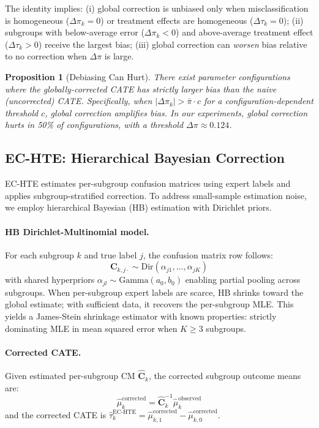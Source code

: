 \documentclass[11pt,twocolumn]{article}
\newtheorem{proposition}{Proposition}
\begin{document}
\noindent The identity implies: (i) global correction is unbiased only when misclassification is homogeneous ($\Delta\pi_k = 0$) or treatment effects are homogeneous ($\Delta\tau_k = 0$); (ii) subgroups with below-average error ($\Delta\pi_k < 0$) and above-average treatment effect ($\Delta\tau_k > 0$) receive the largest bias; (iii) global correction can \emph{worsen} bias relative to no correction when $\Delta\pi$ is large.

\begin{proposition}[Debiasing Can Hurt]
There exist parameter configurations where the globally-corrected CATE has strictly larger bias than the naive (uncorrected) CATE. Specifically, when $|\Delta\pi_k| > \bar{\pi} \cdot c$ for a configuration-dependent threshold $c$, global correction amplifies bias. In our experiments, global correction hurts in 50\% of configurations, with a threshold $\Delta\pi \approx 0.124$.
\end{proposition}

\subsection{EC-HTE: Hierarchical Bayesian Correction}

EC-HTE estimates per-subgroup confusion matrices using expert labels and applies subgroup-stratified correction. To address small-sample estimation noise, we employ hierarchical Bayesian (HB) estimation with Dirichlet priors.

\paragraph{HB Dirichlet-Multinomial model.} For each subgroup $k$ and true label $j$, the confusion matrix row follows:
\begin{equation}
\mathbf{C}_{k,j\cdot} \sim \text{Dir}(\alpha_{j1}, \ldots, \alpha_{jK})
\end{equation}
with shared hyperpriors $\alpha_{jl} \sim \text{Gamma}(a_0, b_0)$ enabling partial pooling across subgroups. When per-subgroup expert labels are scarce, HB shrinks toward the global estimate; with sufficient data, it recovers the per-subgroup MLE. This yields a James-Stein shrinkage estimator with known properties: strictly dominating MLE in mean squared error when $K \geq 3$ subgroups.

\paragraph{Corrected CATE.} Given estimated per-subgroup CM $\hat{\mathbf{C}}_k$, the corrected subgroup outcome means are:
\begin{equation}
\hat{\mu}^{\text{corrected}}_k = \hat{\mathbf{C}}_k^{-1} \hat{\mu}^{\text{observed}}_k
\end{equation}
and the corrected CATE is $\hat{\tau}^{\text{EC-HTE}}_k = \hat{\mu}^{\text{corrected}}_{k,1} - \hat{\mu}^{\text{corrected}}_{k,0}$.
\end{document}

